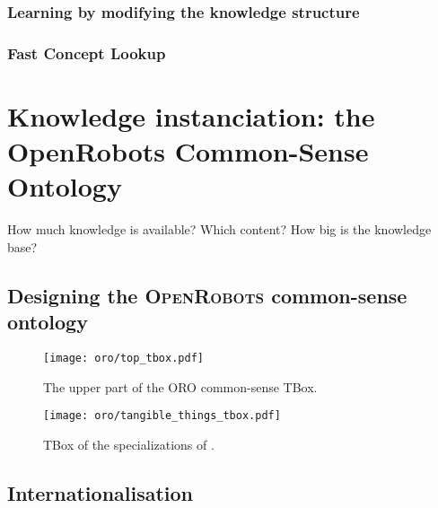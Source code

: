 \subsubsection{Learning by modifying the knowledge structure}

\subsubsection{Fast Concept Lookup}


\section{Knowledge instanciation: the OpenRobots Common-Sense Ontology}

How much knowledge is available? Which content? How big is the knowledge base?

\subsection{Designing the \textsc{OpenRobots} common-sense ontology}
\label{sect|commonsense-design}

\begin{figure}
    \centering
    \texttt{[image: oro/top\_tbox.pdf]}
    \caption{The upper part of the ORO common-sense TBox.}
    \label{fig|upper_tbox}
\end{figure}

\begin{figure}
    \centering
    \texttt{[image: oro/tangible\_things\_tbox.pdf]}
    \caption{TBox of the specializations of .}
    \label{fig|tangible_things_tbox}
\end{figure}

\subsection{Internationalisation}
\label{sect|commonsense-i13n}
